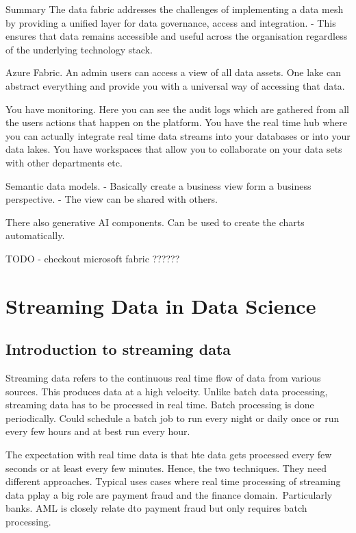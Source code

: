 \documentclass[a4paper, 11pt]{article}
\begin{document}
    Summary
    The data fabric addresses the challenges of implementing a data mesh by providing a unified layer for data governance, access and integration.
    - This ensures that data remains accessible and useful across the organisation regardless of the underlying technology stack.

    Azure Fabric.
    An admin users can access a view of all data assets.
    One lake can abstract everything and provide you with a universal way of accessing that data.

    You have monitoring.
    Here you can see the audit logs which are gathered from all the users actions that happen on the platform.
    You have the real time hub where you can actually integrate real time data streams into your databases or into your data lakes.
    You have workspaces that allow you to collaborate on your data sets with other departments etc.

    Semantic data models.
    - Basically create a business view form a business perspective.
    - The view can be shared with others.

    There also generative AI components.
    Can be used to create the charts automatically.

    TODO - checkout microsoft fabric ??????

    \section{Streaming Data in Data Science}

    \subsection{Introduction to streaming data}

    Streaming data refers to the continuous real time flow of data from various sources.
    This produces data at a high velocity.
    Unlike batch data processing, streaming data has to be processed in real time.
    Batch processing is done periodically.
    Could schedule a batch job to run every night or daily once or run every few hours and at best run every hour.

    The expectation with real time data is that hte data gets processed every few seconds or at least every few minutes.
    Hence, the two techniques.
    They need different approaches.
    Typical uses cases where real time processing of streaming data pplay a big role are payment fraud and the finance domain.\ Particularly banks.
    AML is closely relate dto payment fraud but only requires batch processing.
\end{document}
